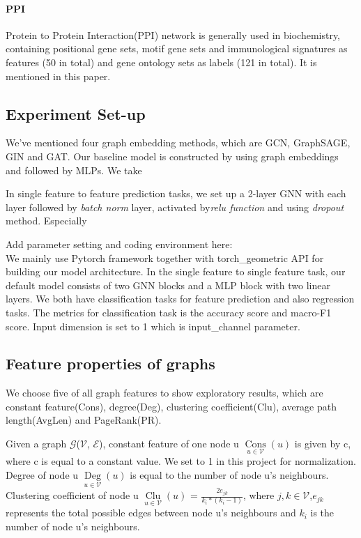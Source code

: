 \documentclass[sigconf]{acmart}
\begin{document}
\paragraph{PPI}
Protein to Protein Interaction(PPI) network is generally used in biochemistry, containing positional gene sets, motif gene sets and immunological signatures as features (50 in total) and gene ontology sets as labels (121 in total). It is mentioned in this paper. 

\subsection{Experiment Set-up}
We've mentioned four graph embedding methods, which are GCN, GraphSAGE, GIN and GAT. 
Our baseline model is constructed by using graph embeddings and followed by MLPs. We take 

In single feature to feature prediction tasks, we set up a 2-layer GNN with each layer followed by \textit{batch norm}
layer, activated by\textit{relu function} and using \textit{dropout} method. Especially  





Add parameter setting and coding environment here:\\

We mainly use Pytorch framework together with torch\_geometric API for building our model architecture.  In the single feature to single feature task, our default model consists of two GNN blocks and a MLP block with two linear layers. We both have classification tasks for feature prediction and also regression tasks. The metrics for classification task is the accuracy score and macro-F1 score. Input dimension is set to 1 which is input\_channel parameter. 

\subsection{Feature properties of graphs}
We choose five of all graph features to show exploratory results, which are constant feature(Cons), degree(Deg), clustering coefficient(Clu), average path length(AvgLen) and PageRank(PR).

Given a graph $\mathcal{G}$($\mathcal{V}$, $\mathcal{E}$), constant feature of one node u $\mathop{Cons}\limits_{u \in \mathcal{V}}(u)$ is given by c, where c is equal to a constant value. We set to 1 in this project for normalization. Degree of node u $\mathop{Deg}\limits_{u \in \mathcal{V}}(u)$ is equal to the number of node u's neighbours. Clustering coefficient of node u $\mathop{Clu}\limits_{u \in \mathcal{V}}(u)$ = $\frac{2e_{jk}}{k_{i} * (k_{i} - 1)}$, where $j,k \in \mathcal{V}$,$e_{jk}$ represents the total possible edges between node u's neighbours and $k_{i}$ is the number of node u's neighbours.
\end{document}
